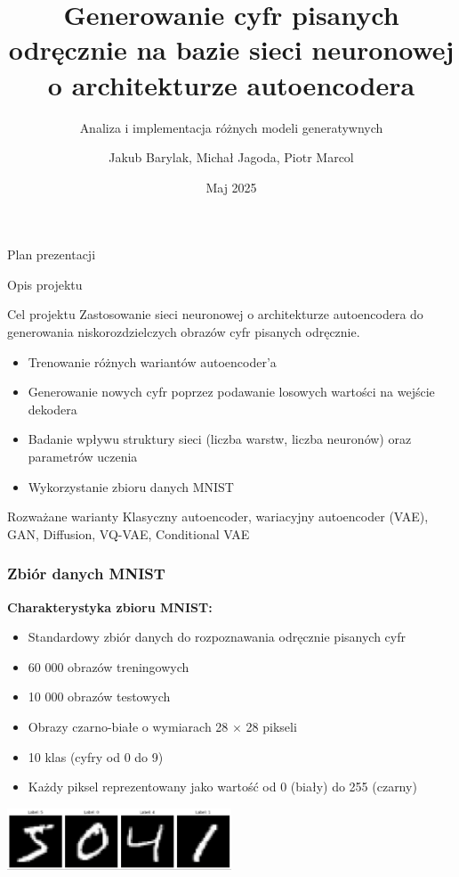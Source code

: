 \documentclass{beamer}
\title{Generowanie cyfr pisanych odręcznie na bazie sieci neuronowej o architekturze autoencodera}
\subtitle{Analiza i implementacja różnych modeli generatywnych}
\author{Jakub Barylak, Michał Jagoda, Piotr Marcol}
\institute{Politechnika Śląska}
\date{Maj 2025}
\begin{document}
\begin{frame}
  \titlepage
\end{frame}

\begin{frame}{Plan prezentacji}
  \tableofcontents
\end{frame}

\begin{frame}{Opis projektu}
  \begin{block}{Cel projektu}
    Zastosowanie sieci neuronowej o architekturze autoencodera do generowania niskorozdzielczych obrazów cyfr pisanych odręcznie.
  \end{block}
  
  \begin{itemize}
    \item Trenowanie różnych wariantów autoencoder'a
    \item Generowanie nowych cyfr poprzez podawanie losowych wartości na wejście dekodera
    \item Badanie wpływu struktury sieci (liczba warstw, liczba neuronów) oraz parametrów uczenia
    \item Wykorzystanie zbioru danych MNIST
  \end{itemize}
  
  \begin{block}{Rozważane warianty}
    Klasyczny autoencoder, wariacyjny autoencoder (VAE), GAN, Diffusion, VQ-VAE, Conditional VAE
  \end{block}
\end{frame}

\begin{frame}
  \frametitle{Zbiór danych MNIST}
  
  \textbf{Charakterystyka zbioru MNIST:}
  \begin{itemize}
      \item Standardowy zbiór danych do rozpoznawania odręcznie pisanych cyfr
      \item 60 000 obrazów treningowych
      \item 10 000 obrazów testowych
      \item Obrazy czarno-białe o wymiarach 28 $\times$ 28 pikseli
      \item 10 klas (cyfry od 0 do 9)
      \item Każdy piksel reprezentowany jako wartość od 0 (biały) do 255 (czarny)
  \end{itemize}

  \vspace{0.5cm}
  \begin{center}
    \includegraphics[width=0.5\textwidth]{img/mnist_example.png}\\
  \end{center}
\end{frame}
\end{document}
